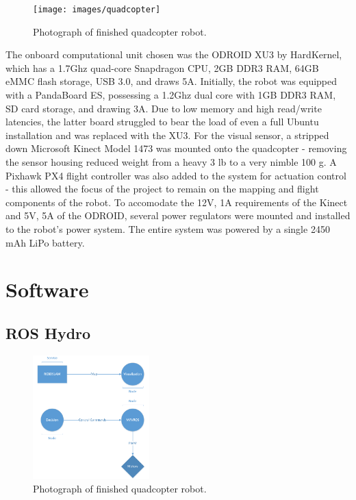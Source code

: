 \documentclass[letterpaper, oneside, 10pt]{report}
\begin{document}
\begin{figure}[h!]
 \caption{Photograph of finished quadcopter robot.}
 \centering
   \texttt{[image: images/quadcopter]}
\end{figure}

\noindent The onboard computational unit chosen was the ODROID XU3 by HardKernel, which has a 1.7Ghz quad-core Snapdragon CPU, 2GB DDR3 RAM, 64GB eMMC flash storage, USB 3.0, and draws 5A. Initially, the robot was equipped with a PandaBoard ES, possessing a 1.2Ghz dual core with 1GB DDR3 RAM, SD card storage, and drawing 3A. Due to low memory and high read/write latencies, the latter board struggled to bear the load of even a full Ubuntu installation and was replaced with the XU3. For the visual sensor, a stripped down Microsoft Kinect Model 1473 was mounted onto the quadcopter - removing the sensor housing reduced weight from a heavy 3 lb to a very nimble 100 g. A Pixhawk PX4 flight controller was also added to the system for actuation control - this allowed the focus of the project to remain on the mapping and flight components of the robot. To accomodate the 12V, 1A requirements of the Kinect and 5V, 5A of the ODROID, several power regulators were mounted and installed to the robot's power system. The entire system was powered by a single 2450 mAh LiPo battery.

\section{Software}

\subsection{ROS Hydro}

\begin{figure}[h!]
 \caption{Photograph of finished quadcopter robot.}
 \centering
   \includegraphics[width=0.4\textwidth]{images/ros_arch}
\end{figure}
\end{document}
